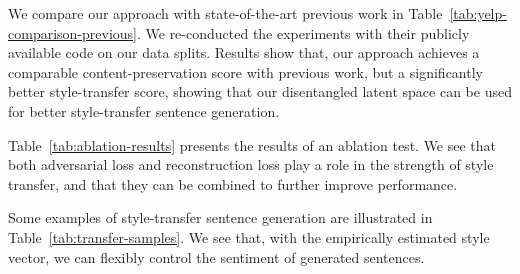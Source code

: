 \documentclass[11pt,a4paper]{article}
\begin{document}
We compare our approach with state-of-the-art previous work in Table~\ref{tab:yelp-comparison-previous}. We re-conducted the experiments with their publicly available code on our data splits.
Results show that, our approach achieves a comparable content-preservation score with previous work, but a significantly better style-transfer score, showing that our disentangled latent space can be used for better style-transfer sentence generation.

Table~\ref{tab:ablation-results} presents the results of an ablation test. We see that both adversarial loss and reconstruction loss play a role in the strength of style transfer, and that they can be combined to further improve performance.


Some examples of style-transfer sentence generation are illustrated in Table~\ref{tab:transfer-samples}. We see that, with the empirically estimated style vector, we can flexibly control the sentiment of generated sentences.
\end{document}
